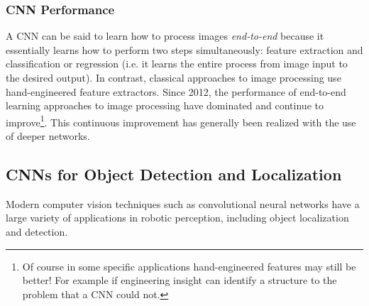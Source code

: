 \subsubsection{CNN Performance}
A CNN can be said to learn how to process images \textit{end-to-end} because it essentially learns how to perform two steps simultaneously: feature extraction and classification or regression (i.e. it learns the entire process from image input to the desired output). In contrast, classical approaches to image processing use hand-engineered feature extractors. Since 2012, the performance of end-to-end learning approaches to image processing have dominated and continue to improve\footnote{Of course in some specific applications hand-engineered features may still be better! For example if engineering insight can identify a structure to the problem that a CNN could not.}. This continuous improvement has generally been realized with the use of deeper networks.

\subsection{CNNs for Object Detection and Localization}
Modern computer vision techniques such as convolutional neural networks have a large variety of applications in robotic perception, including object localization and detection.

